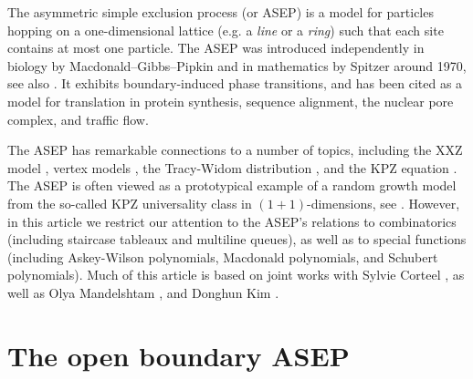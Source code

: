 \documentclass[11pt]{amsart}
\theoremstyle{definition}
\theoremstyle{remark}
\begin{document}
The asymmetric simple exclusion process (or ASEP)
is a model for
 particles hopping on a one-dimensional lattice 
	(e.g. a \emph{line} or a \emph{ring}) such that
each site contains at most one particle.
The ASEP was introduced independently
in biology %
by Macdonald--Gibbs--Pipkin \cite{bio} 
and in mathematics by Spitzer \cite{Spitzer} around 1970, see also
\cite{Liggett}.
It exhibits boundary-induced phase transitions,
and has been cited as a model for translation in 
	protein synthesis,
sequence alignment, the nuclear pore complex, and traffic flow.

The ASEP has remarkable connections to a number of topics,
including the XXZ model \cite{Sandow},  vertex models  \cite{BorodinPetrov, BorodinWheeler},
	the Tracy-Widom distribution \cite{Johansson, TracyWidom}, 
	and the KPZ equation \cite{BG, CorwinShenTsai, CorwinShen, CorwinKnizel}.
	The ASEP is often viewed as a prototypical example of a random growth model from the 
	so-called KPZ universality class in $(1+1)$-dimensions, see 
	\cite{KPZ, Corwin, Quastel}.  
	However,
in this article we restrict our attention to the ASEP's relations
	to combinatorics 
	(including 
	staircase tableaux and multiline queues), as well as 
	to special functions
(including Askey-Wilson polynomials,
Macdonald polynomials,
and Schubert polynomials).   
Much of this article is based on 
joint works with Sylvie Corteel \cite{CW1, CW2,CWPNAS,CW4}, 
as well as Olya Mandelshtam \cite{CMW2}, 
and Donghun Kim \cite{KW}.



\section{The open boundary ASEP}
\end{document}
